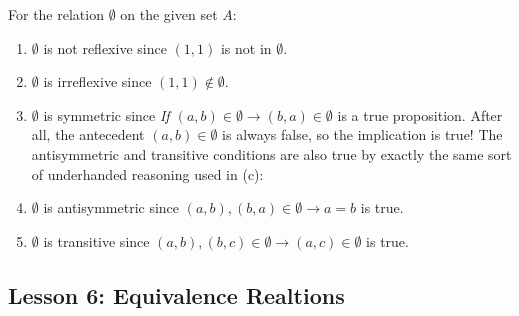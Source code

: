 \documentclass[11pt]{amsart}
\begin{document}
\begin{enumerate}
For the relation $\emptyset$ on the given set $A$:
\begin{enumerate}

\item $\emptyset$ is not reflexive since $(1,1)$ is not in $\emptyset$. 

\item $\emptyset$ is irreflexive since  $(1,1) \not\in \emptyset$.

\item $\emptyset$ is symmetric since
{\it  If $ (a,b)\in\emptyset \longrightarrow (b,a)\in\emptyset$} is a true
proposition. After all, the
antecedent  $(a,b)\in \emptyset$ is always false,
so the implication is true!
\vskip3pt
The antisymmetric and transitive conditions are also true by exactly the
same sort of underhanded reasoning used in (c):
\vskip 3pt

\item $\emptyset$ is antisymmetric since $(a,b), (b,a) \in \emptyset \longrightarrow a=b$
is true.

\item $\emptyset$ is transitive since $(a,b), (b,c)\in \emptyset \longrightarrow (a,c)\in \emptyset$ is true.

\end{enumerate}

\end{enumerate}

\subsection{Lesson 6: Equivalence Realtions}
\end{document}
